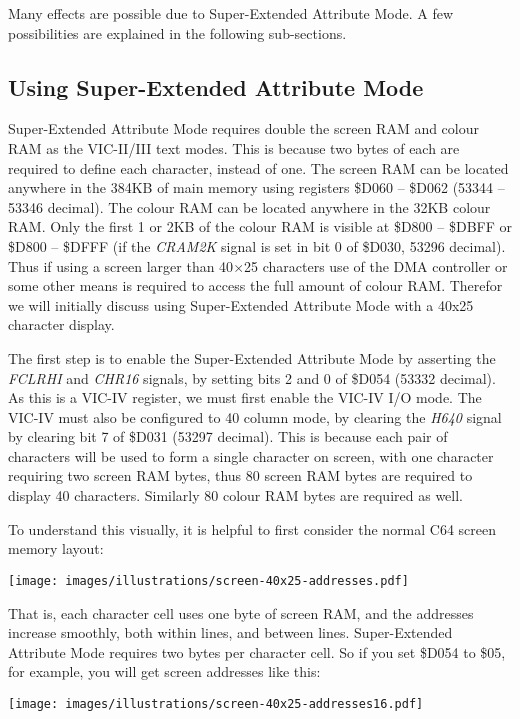 Many effects are possible due to Super-Extended Attribute Mode.  A few possibilities are explained in the following sub-sections.

\subsection{Using Super-Extended Attribute Mode}

Super-Extended Attribute Mode requires double the screen RAM and colour RAM as the VIC-II/III text modes. This is because two bytes of each are required to define each character, instead of one.  The screen RAM can be located anywhere in the 384KB of main memory using registers \$D060 -- \$D062 (53344 -- 53346 decimal).  The colour RAM can be located anywhere in the 32KB colour RAM.  Only the first 1 or 2KB of the colour RAM is visible at \$D800 -- \$DBFF or \$D800 -- \$DFFF (if the {\em CRAM2K} signal is set in bit 0 of \$D030, 53296 decimal).  Thus if using a screen larger than 40$\times$25 characters use of the DMA controller or some other means is required to access the full amount of colour RAM.  Therefor we will initially discuss using Super-Extended Attribute Mode with a 40x25 character display.

The first step is to enable the Super-Extended Attribute Mode by asserting the {\em FCLRHI} and {\em CHR16} signals, by setting bits 2 and 0 of \$D054 (53332 decimal).  As this is a VIC-IV register, we must first enable the VIC-IV I/O mode.  The VIC-IV must also be configured to 40 column mode, by clearing the {\em H640} signal by clearing bit 7 of \$D031 (53297 decimal).  This is because each pair of characters will be used to form a single character on screen, with one character requiring two screen RAM bytes, thus 80 screen RAM bytes are required to display 40 characters.  Similarly 80 colour RAM bytes are required as well.

To understand this visually, it is helpful to first consider the normal C64 screen memory layout:

\texttt{[image: images/illustrations/screen-40x25-addresses.pdf]}

That is, each character cell uses one byte of screen RAM, and the addresses increase smoothly, both within lines, and between lines.
Super-Extended Attribute Mode requires two bytes per character cell. So if you set \$D054 to \$05, for example, you will get screen addresses like this:

\texttt{[image: images/illustrations/screen-40x25-addresses16.pdf]}

